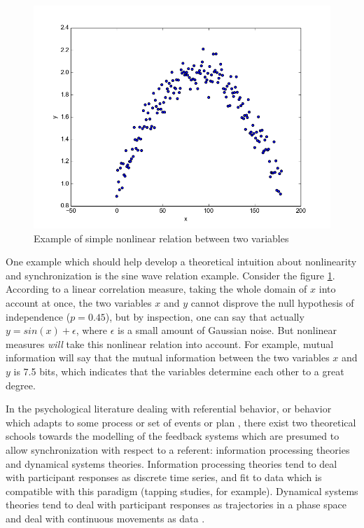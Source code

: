 \documentclass[12pt]{article}
\begin{document}
\begin{figure}\label{fig:nonlinearity}
  \begin{center}
    \includegraphics[scale=0.5]{mi_ex}
  \end{center}
  \caption{Example of simple nonlinear relation between two variables}
\end{figure}

One example which should help develop a theoretical intuition about nonlinearity and synchronization is the sine wave relation example. Consider the figure \ref{fig:nonlinearity}. According to a linear correlation measure, taking the whole domain of $x$ into account at once, the two variables $x$ and $y$ cannot disprove the null hypothesis of independence ($p=0.45$), but by inspection, one can say that actually $y = sin(x) + \epsilon$, where $\epsilon$ is a small amount of Gaussian noise. But nonlinear measures \emph{will} take this nonlinear relation into account. For example, mutual information will say that the mutual information between the two variables $x$ and $y$ is 7.5 bits, which indicates that the variables determine each other to a great degree. %


In the psychological literature dealing with referential behavior, or behavior which adapts to some process or set of events or plan \cite{pressing}, there exist two theoretical schools towards the modelling of the feedback systems which are presumed to allow synchronization with respect to a referent: information processing theories and dynamical systems theories. Information processing theories tend to deal with participant responses as discrete time series, and fit to data which is compatible with this paradigm (tapping studies, for example). Dynamical systems theories tend to deal with participant responses as trajectories in a phase space and deal with continuous movements as data \cite{repp}.
\end{document}
